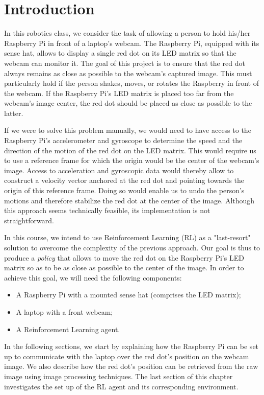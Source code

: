 \chapter{Introduction}

In this robotics class, we consider the task of allowing a person to hold his/her Raspberry Pi in front of a laptop's webcam.  The Raspberry Pi, equipped with its sense hat,  allows to display a single red dot on its LED matrix so that the webcam can monitor it. The goal of this project is to ensure that the red dot always remains as close as possible to the webcam's captured image. This must particularly hold if the person shakes, moves, or rotates the Raspberry in front of the webcam. If the Raspberry Pi's LED matrix is placed too far from the webcam's image center, the red dot should be placed as close as possible to the latter.

If we were to solve this problem manually, we would need to have access to the Raspberry Pi's accelerometer and gyroscope to determine the speed and the direction of the motion of the red dot on the LED matrix. This would require us to use a reference frame for which the origin would be the center of the webcam's image. Access to acceleration and gyroscopic data would thereby allow to construct a velocity vector anchored at the red dot and pointing towards the origin of this reference frame. Doing so would enable us to undo the person's motions and therefore stabilize the red dot at the center of the image. Although this approach seems technically feasible, its implementation is not straightforward. 

In this course, we intend to use Reinforcement Learning (RL) as a "last-resort" solution to overcome the complexity of the previous approach. Our goal is thus to produce a \textit{policy} that allows to move the red dot on the Raspberry Pi's LED matrix so as to be as close as possible to the center of the image. In order to achieve this goal, we will need the following components:

\begin{itemize}
	\item A Raspberry Pi with a mounted sense hat (comprises the LED matrix);
	\item A laptop with a front webcam;
	\item A Reinforcement Learning agent.
\end{itemize}

In the following sections, we start by explaining how the Raspberry Pi can be set up to communicate with the laptop over the red dot's position on the webcam image.  We also describe how the red dot's position can be retrieved from the raw image using image processing techniques. The last section of this chapter investigates the set up of the RL agent and its corresponding environment.

